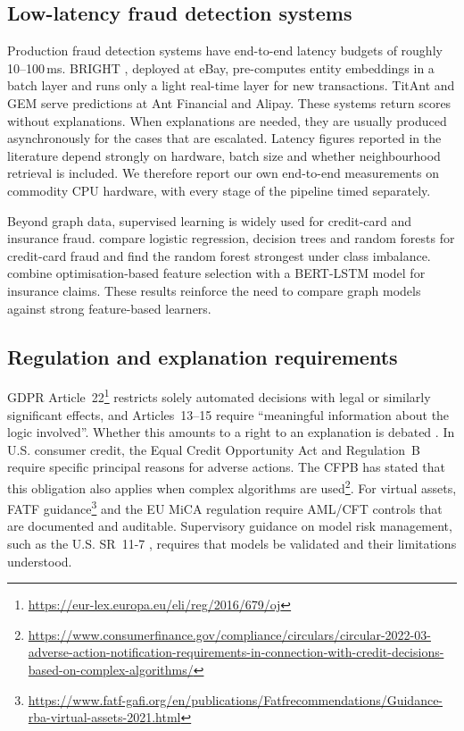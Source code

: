 \subsection{Low-latency fraud detection systems}

Production fraud detection systems have end-to-end latency budgets of roughly 10--100\,ms. BRIGHT \citep{lu2022bright}, deployed at eBay, pre-computes entity embeddings in a batch layer and runs only a light real-time layer for new transactions. TitAnt \citep{cao2019titant,dong2025enhancing} and GEM \citep{liu2018gem, rao2025fraud} serve predictions at Ant Financial and Alipay. These systems return scores without explanations. When explanations are needed, they are usually produced asynchronously for the cases that are escalated. Latency figures reported in the literature depend strongly on hardware, batch size and whether neighbourhood retrieval is included. We therefore report our own end-to-end measurements on commodity CPU hardware, with every stage of the pipeline timed separately.

Beyond graph data, supervised learning is widely used for credit-card and insurance fraud. \citet{afriyie2023supervised} compare logistic regression, decision trees and random forests for credit-card fraud and find the random forest strongest under class imbalance. \citet{jacob2025golden} combine optimisation-based feature selection with a BERT-LSTM model for insurance claims. These results reinforce the need to compare graph models against strong feature-based learners.

\subsection{Regulation and explanation requirements}

GDPR Article~22\footnote{\url{https://eur-lex.europa.eu/eli/reg/2016/679/oj}} restricts solely automated decisions with legal or similarly significant effects, and Articles~13--15 require ``meaningful information about the logic involved''. Whether this amounts to a right to an explanation is debated \citep{wachter2017righttoexplanation, selbst2017meaningful, goodman2016explanation, sargeant2026mind}. In U.S. consumer credit, the Equal Credit Opportunity Act \citep{ecoa1974} and Regulation~B require specific principal reasons for adverse actions. The CFPB has stated that this obligation also applies when complex algorithms are used\footnote{\url{https://www.consumerfinance.gov/compliance/circulars/circular-2022-03-adverse-action-notification-requirements-in-connection-with-credit-decisions-based-on-complex-algorithms/}}. For virtual assets, FATF guidance\footnote{\url{https://www.fatf-gafi.org/en/publications/Fatfrecommendations/Guidance-rba-virtual-assets-2021.html}} and the EU MiCA regulation \citep{teng2026digital} require AML/CFT controls that are documented and auditable. Supervisory guidance on model risk management, such as the U.S. SR~11-7 \citep{sr117}, requires that models be validated and their limitations understood.

